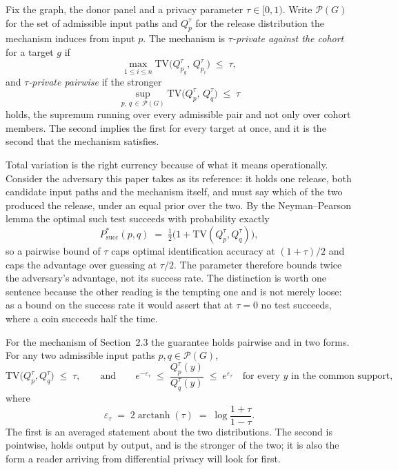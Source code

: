 Fix the graph, the donor panel and a privacy parameter $\tau \in [0,1)$. Write
$\mathcal{P}(G)$ for the set of admissible input paths and $Q^{\tau}_{p}$ for the
release distribution the mechanism induces from input $p$. The mechanism is
\emph{$\tau$-private against the cohort} for a target $g$ if
\begin{equation}
\max_{1 \le i \le n} \mathrm{TV}\!\big(Q^{\tau}_{p_g},\, Q^{\tau}_{p_i}\big)
\;\le\; \tau ,
\end{equation}
and \emph{$\tau$-private pairwise} if the stronger
\begin{equation}
\sup_{p,\,q \,\in\, \mathcal{P}(G)}
\mathrm{TV}\!\big(Q^{\tau}_{p},\, Q^{\tau}_{q}\big) \;\le\; \tau
\end{equation}
holds, the supremum running over every admissible pair and not only over cohort
members. The second implies the first for every target at once, and it is the second
that the mechanism satisfies.

Total variation is the right currency because of what it means operationally.
Consider the adversary this paper takes as its reference: it holds one release, both
candidate input paths and the mechanism itself, and must say which of the two
produced the release, under an equal prior over the two. By the Neyman--Pearson
lemma the optimal such test succeeds with probability exactly
\begin{equation}
P^{*}_{\mathrm{succ}}(p,q)
\;=\; \tfrac{1}{2}\big(1 + \mathrm{TV}(Q^{\tau}_{p}, Q^{\tau}_{q})\big),
\label{eq:succ}
\end{equation}
so a pairwise bound of $\tau$ caps optimal identification accuracy at $(1+\tau)/2$
and caps the advantage over guessing at $\tau/2$. The parameter therefore bounds
twice the adversary's advantage, not its success rate. The distinction is worth one
sentence because the other reading is the tempting one and is not merely loose: as a
bound on the success rate it would assert that at $\tau = 0$ no test succeeds, where
a coin succeeds half the time.

For the mechanism of Section~2.3 the guarantee holds pairwise and in two forms. For
any two admissible input paths $p, q \in \mathcal{P}(G)$,
\begin{equation}
\mathrm{TV}\!\big(Q^{\tau}_{p}, Q^{\tau}_{q}\big) \;\le\; \tau,
\qquad\text{and}\qquad
e^{-\varepsilon_\tau} \;\le\; \frac{Q^{\tau}_{p}(y)}{Q^{\tau}_{q}(y)}
\;\le\; e^{\varepsilon_\tau}
\quad\text{for every } y \text{ in the common support},
\label{eq:thm}
\end{equation}
where
\begin{equation}
\varepsilon_\tau \;=\; 2\operatorname{arctanh}(\tau)
\;=\; \log\frac{1+\tau}{1-\tau}.
\end{equation}
The first is an averaged statement about the two distributions. The second is
pointwise, holds output by output, and is the stronger of the two; it is also the
form a reader arriving from differential privacy will look for first.

